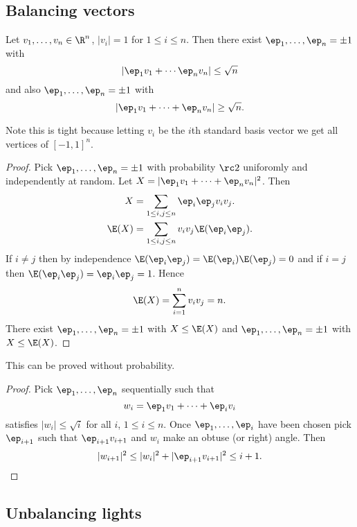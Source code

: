 
\subsection{Balancing vectors}

\begin{thm}
Let $v_1,\ldots, v_n\in \R^n$, $|v_i|=1$ for $1\leq i\leq n$. Then there exist $\ep_1,\ldots, \ep_n=\pm1$ with
\[
|\ep_1v_1+\cdots \ep_nv_n|\leq \sqrt n
\]
and also $\ep_1,\ldots, \ep_n=\pm1$ with
\[
|\ep_1v_1+\cdots +\ep_n v_n|\geq \sqrt n.
\]
\end{thm}
Note this is tight because letting $v_i$ be the $i$th standard basis vector we get all vertices of $[-1,1]^n$.
\begin{proof}
Pick $\ep_1,\ldots, \ep_n=\pm 1$ with probability $\rc 2$ uniforomly and independently at random. Let $X=|\ep_1v_1+\cdots +\ep_nv_n|^2$. Then
\begin{align*}
X&=\sum_{1\leq i,j\leq n} \ep_i\ep_j v_iv_j.\\
\E(X)&=\sum_{1\leq i,j\leq n}v_iv_j\E(\ep_i\ep_j).
\end{align*}
If $i\neq j$ then by independence $\E(\ep_i\ep_j)=\E(\ep_i)\E(\ep_j)=0$ and if $i=j$ then $\E(\ep_i\ep_j)=\ep_i\ep_j=1$. Hence
\[
\E(X)=\sum_{i=1}^n v_iv_j =n.
\]
There exist $\ep_1,\ldots, \ep_n=\pm1$ with $X\leq \E(X)$ and $\ep_1,\ldots, \ep_n=\pm 1$ with $X\leq \E(X)$.
\end{proof}
This can be proved without probability.
\begin{proof}
Pick $\ep_1,\ldots, \ep_n$ sequentially such that 
\[w_i=\ep_1v_1+\cdots +\ep_iv_i\]
satisfies $|w_i|\leq \sqrt i$ for all $i$, $1\leq i\leq n$. Once $\ep_1,\ldots, \ep_i$ have been chosen pick $\ep_{i+1}$ such that $\ep_{i+1}v_{i+1}$ and $w_i$ make an obtuse (or right) angle. Then
\[
|w_{i+1}|^2\leq |w_i|^2+|\ep_{i+1}v_{i+1}|^2\leq i+1.
\]
\end{proof}

\subsection{Unbalancing lights}

